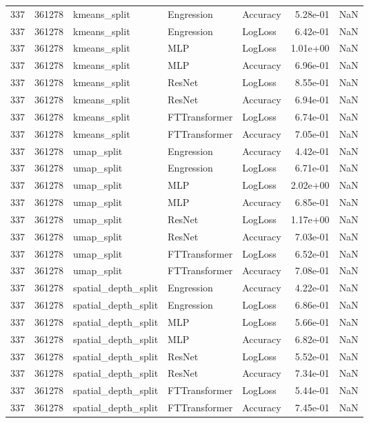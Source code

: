 \begin{tabular}{rrlllrr}
337 & 361278 & kmeans\_split & Engression & Accuracy & 5.28e-01 & NaN \\
337 & 361278 & kmeans\_split & Engression & LogLoss & 6.42e-01 & NaN \\
337 & 361278 & kmeans\_split & MLP & LogLoss & 1.01e+00 & NaN \\
337 & 361278 & kmeans\_split & MLP & Accuracy & 6.96e-01 & NaN \\
337 & 361278 & kmeans\_split & ResNet & LogLoss & 8.55e-01 & NaN \\
337 & 361278 & kmeans\_split & ResNet & Accuracy & 6.94e-01 & NaN \\
337 & 361278 & kmeans\_split & FTTransformer & LogLoss & 6.74e-01 & NaN \\
337 & 361278 & kmeans\_split & FTTransformer & Accuracy & 7.05e-01 & NaN \\
337 & 361278 & umap\_split & Engression & Accuracy & 4.42e-01 & NaN \\
337 & 361278 & umap\_split & Engression & LogLoss & 6.71e-01 & NaN \\
337 & 361278 & umap\_split & MLP & LogLoss & 2.02e+00 & NaN \\
337 & 361278 & umap\_split & MLP & Accuracy & 6.85e-01 & NaN \\
337 & 361278 & umap\_split & ResNet & LogLoss & 1.17e+00 & NaN \\
337 & 361278 & umap\_split & ResNet & Accuracy & 7.03e-01 & NaN \\
337 & 361278 & umap\_split & FTTransformer & LogLoss & 6.52e-01 & NaN \\
337 & 361278 & umap\_split & FTTransformer & Accuracy & 7.08e-01 & NaN \\
337 & 361278 & spatial\_depth\_split & Engression & Accuracy & 4.22e-01 & NaN \\
337 & 361278 & spatial\_depth\_split & Engression & LogLoss & 6.86e-01 & NaN \\
337 & 361278 & spatial\_depth\_split & MLP & LogLoss & 5.66e-01 & NaN \\
337 & 361278 & spatial\_depth\_split & MLP & Accuracy & 6.82e-01 & NaN \\
337 & 361278 & spatial\_depth\_split & ResNet & LogLoss & 5.52e-01 & NaN \\
337 & 361278 & spatial\_depth\_split & ResNet & Accuracy & 7.34e-01 & NaN \\
337 & 361278 & spatial\_depth\_split & FTTransformer & LogLoss & 5.44e-01 & NaN \\
337 & 361278 & spatial\_depth\_split & FTTransformer & Accuracy & 7.45e-01 & NaN \\

\end{tabular}
